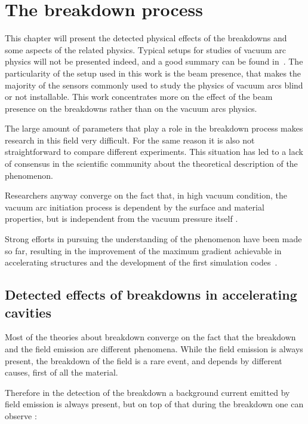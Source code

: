 \chapter[The breakdown process]{The breakdown process}
\label{chap:BDs}

This chapter will present the detected physical effects of the breakdowns and some aspects of the related physics. Typical setups for studies of vacuum arc physics will not be presented indeed, and a good summary can be found in~\cite{Kovermann:1330346}. The particularity of the setup used in this work is the beam presence, that makes the majority of the sensors commonly used to study the physics of vacuum arcs blind or not installable. This work concentrates more on the effect of the beam presence on the breakdowns rather than on the vacuum arcs physics. 

The large amount of parameters that play a role in the breakdown process makes research in this field very difficult. For the same reason it is also not straightforward to compare different experiments. This situation has led to a lack of consensus in the scientific community about the theoretical description of the phenomenon.

Researchers anyway converge on the fact that, in high vacuum condition, the vacuum arc initiation process is dependent by the surface and material properties, but is independent from the vacuum pressure itself \cite{alpert:triggers}.

Strong efforts in pursuing the understanding of the phenomenon have been made so far, resulting in the improvement of the maximum gradient achievable in accelerating structures and the development of the first simulation codes~\cite{Insepov:1373092}.



\section[Detected effects of breakdowns in accelerating cavities]{Detected effects of breakdowns in accelerating cavities}
\label{sec:affects_of_BD}

Most of the theories about breakdown converge on the fact that the breakdown and the field emission are different phenomena. While the field emission is always present, the breakdown of the field is a rare event, and depends by different causes, first of all the material.

Therefore in the detection of the breakdown a background current emitted by field emission is always present, but on top of that during the breakdown one can observe \cite{Wuensch:583549}:

